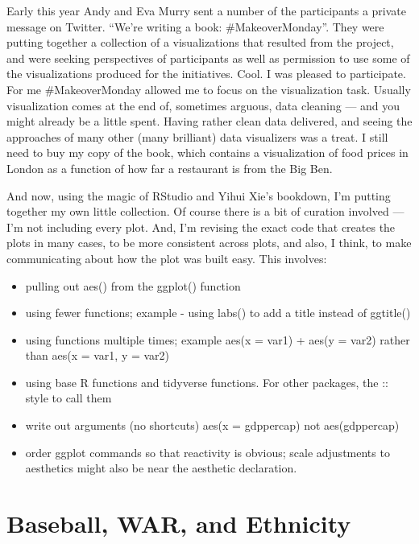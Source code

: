 \documentclass[]{book}
\providecommand{\tightlist}{%
  \setlength{\itemsep}{0pt}\setlength{\parskip}{0pt}}
\theoremstyle{definition}
\theoremstyle{definition}
\theoremstyle{definition}
\theoremstyle{remark}
\begin{document}
Early this year Andy and Eva Murry sent a number of the participants a
private message on Twitter. ``We're writing a book: \#MakeoverMonday''.
They were putting together a collection of a visualizations that
resulted from the project, and were seeking perspectives of participants
as well as permission to use some of the visualizations produced for the
initiatives. Cool. I was pleased to participate. For me \#MakeoverMonday
allowed me to focus on the visualization task. Usually visualization
comes at the end of, sometimes arguous, data cleaning --- and you might
already be a little spent. Having rather clean data delivered, and
seeing the approaches of many other (many brilliant) data visualizers
was a treat. I still need to buy my copy of the book, which contains a
visualization of food prices in London as a function of how far a
restaurant is from the Big Ben.

And now, using the magic of RStudio and Yihui Xie's bookdown, I'm
putting together my own little collection. Of course there is a bit of
curation involved --- I'm not including every plot. And, I'm revising
the exact code that creates the plots in many cases, to be more
consistent across plots, and also, I think, to make communicating about
how the plot was built easy. This involves:

\begin{itemize}
\tightlist
\item
  pulling out aes() from the ggplot() function
\item
  using fewer functions; example - using labs() to add a title instead
  of ggtitle()
\item
  using functions multiple times; example aes(x = var1) + aes(y = var2)
  rather than aes(x = var1, y = var2)
\item
  using base R functions and tidyverse functions. For other packages,
  the :: style to call them
\item
  write out arguments (no shortcuts) aes(x = gdppercap) not
  aes(gdppercap)
\item
  order ggplot commands so that reactivity is obvious; scale adjustments
  to aesthetics might also be near the aesthetic declaration.
\end{itemize}

\chapter{Baseball, WAR, and Ethnicity}\label{baseball-war-and-ethnicity}
\end{document}

